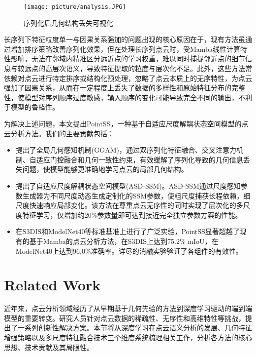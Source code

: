 \documentclass[preprint,12pt]{elsarticle}
\begin{document}
\begin{figure}[htbp]
	\centering
	\texttt{[image: picture/analysis.JPG]}
	\caption{序列化后几何结构丢失可视化}
	\label{fig:analysis}
\end{figure}

长序列下特征粒度单一与因果关系强加的问题出现的核心原因在于，现有方法虽通过增加排序策略改善序列化效果，但在处理长序列点云时，受Mamba线性计算特性影响，无法在邻域内精准区分远近点的学习权重，难以同时捕捉邻近点的细节信息与较远点的高层次语义，导致特征提取的粒度与层次化不足。此外，这些方法常依赖对点云进行特定排序或结构化预处理，忽略了点云本质上的无序特性，为点云强加了因果关系，从而在一定程度上丢失了数据的多样性和原始特征分布的完整性，使模型对序列顺序过度敏感，输入顺序的变化可能导致完全不同的输出，不利于模型的鲁棒性。

为解决上述问题，本文提出PointSS，一种基于自适应尺度解耦状态空间模型的点云分析方法。我们的主要贡献包括：

\begin{itemize}
	\item 提出了全局几何感知机制(GGAM)，通过双序列化特征融合、交叉注意力机制、自适应门控融合和几何一致性约束，有效缓解了序列化导致的几何信息丢失问题，使模型能够更准确地学习点云的局部几何结构。
	
	\item 提出了自适应尺度解耦状态空间模型(ASD-SSM)。ASD-SSM通过尺度感知参数生成器为不同尺度动态生成定制化的SSM参数，使粗尺度捕获长程依赖，细尺度快速响应局部变化。该方法在尊重点云无序性的同时实现了层次化的多尺度特征学习，仅增加约20\%参数量即可达到接近完全独立参数方案的性能。
	
	\item 在S3DIS和ModelNet40等标准基准上进行了广泛实验，PointSS显著超越了现有的基于Mamba的点云分析方法，在S3DIS上达到75.2\% mIoU，在ModelNet40上达到96.0\%准确率。详尽的消融实验验证了各组件的有效性。
\end{itemize}





\section{Related Work}
近年来，点云分析领域经历了从早期基于几何先验的方法到深度学习驱动的端到端模型的重要转变。研究人员针对点云数据的稀疏性、无序性和高维特性等挑战，提出了一系列创新性解决方案。本节将从深度学习在点云语义分析的发展、几何特征增强策略以及多尺度特征融合技术三个维度系统梳理相关工作，分析各方法的核心思想、技术贡献及其局限性。
\end{document}
